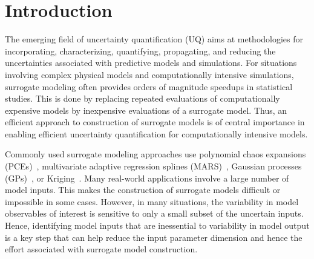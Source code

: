 \section{Introduction}
\label{sec:intro}


The emerging field of uncertainty quantification (UQ) aims at methodologies for
incorporating, characterizing, quantifying, propagating, and reducing the
uncertainties associated with predictive models and simulations.  For
situations involving complex physical models and computationally intensive
simulations, surrogate modeling often provides orders of magnitude speedups in
statistical studies. This is done by replacing repeated evaluations of
computationally expensive models by inexpensive evaluations of a surrogate
model.  Thus, an efficient approach to construction of surrogate models is of
central importance in enabling efficient uncertainty quantification for
computationally intensive models. 


Commonly used surrogate modeling approaches use polynomial chaos expansions
(PCEs)~\cite{Xiu:2002,Ghanem:2003,Olivier:2010}, multivariate adaptive
regression splines (MARS)~\cite{friedman93}, Gaussian processes
(GPs)~\cite{Rasmussen:2004}, or Kriging~\cite{Stein:2012}.  Many real-world
applications involve a large number of model inputs. This makes
the construction of surrogate models difficult or impossible in some cases.
However, in many situations, the variability in model observables of interest
is sensitive to only a small subset of the uncertain inputs.  Hence,
identifying model inputs that are inessential to variability in model output is
a key step that can help reduce the input parameter dimension and hence the effort
associated with surrogate model construction. 


